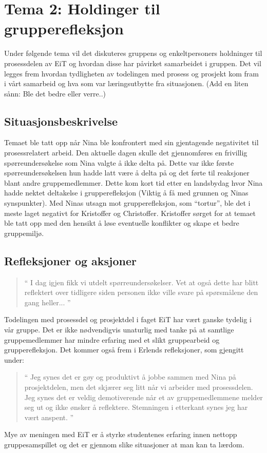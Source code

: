 \chapter{Tema 2: Holdinger til grupperefleksjon}

Under følgende tema vil det diskuteres gruppens og enkeltpersoners holdninger til prosessdelen av EiT og hvordan
disse har påvirket samarbeidet i gruppen. Det vil legges frem hvordan tydligheten av todelingen med prosess og 
prosjekt kom fram i vårt samarbeid og hva som var læringsutbytte fra situasjonen. (Add en liten sånn: Ble det bedre eller verre..)

\section{Situasjonsbeskrivelse}

Temaet ble tatt opp når Nina ble konfrontert med sin gjentagende negativitet til prosessrelatert arbeid. Den aktuelle 
dagen skulle det gjennomføres en frivillig spørreundersøkelse som Nina valgte å ikke delta på. Dette var ikke første 
spørreundersøkelsen hun hadde latt være å delta på og det førte til reaksjoner blant andre gruppemedlemmer. 
Dette kom kort tid etter en landsbydag hvor Nina hadde nektet deltakelse i grupperefleksjon (Viktig å få med 
grunnen og Ninas synspunkter). Med Ninas utsagn mot grupperefleksjon, som ``tortur'', ble det i meste laget
negativt for Kristoffer og Christoffer. Kristoffer sørget for at temaet ble tatt opp med den hensikt å løse eventuelle
konflikter og skape et bedre gruppemiljø. 

\section{Refleksjoner og aksjoner}


\begin{quote}``
I dag igjen fikk vi utdelt spørreundersøkelser. Vet at også dette har blitt reflektert over tidligere siden personen ikke 
ville svare på spørsmålene den gang heller... 
''\end{quote} 


Todelingen med prosessdel og prosjektdel i faget EiT har vært ganske tydelig i vår gruppe. Det er ikke 
nødvendigvis unaturlig med tanke på at samtlige gruppemedlemmer har mindre erfaring med et slikt gruppearbeid 
og grupperefleksjon. Det kommer også frem i Erlends refleksjoner, som gjengitt under:
\begin{quote}``
Jeg synes det er gøy og produktivt å jobbe sammen med Nina på prosjektdelen, men det skjærer seg litt når vi 
arbeider med prosessdelen. Jeg synes det er veldig demotiverende når et av gruppemedlemmene melder seg ut 
og ikke ønsker å reflektere. Stemningen i etterkant synes jeg har vært anspent.
''\end{quote} 
Mye av meningen med EiT er å styrke studentenes erfaring innen nettopp gruppesamspillet og det er gjennom
slike situasjoner at man kan ta lærdom. 


